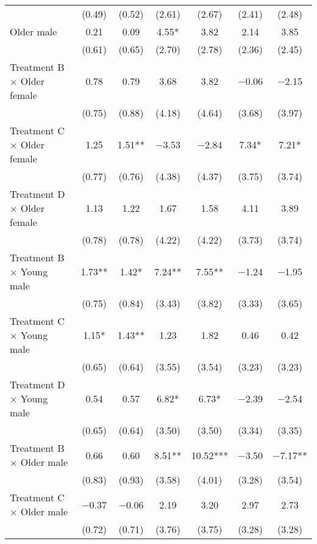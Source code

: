 \documentclass[12pt, a4paper]{article}
\begin{document}
\begin{table}[H]
\begin{threeparttable}
\begin{tabular}[t]{lcccccc}
 & (\num{0.49}) & (\num{0.52}) & (\num{2.61}) & (\num{2.67}) & (\num{2.41}) & (\num{2.48})\\
Older male & \num{0.21} & \num{0.09} & \num{4.55}* & \num{3.82} & \num{2.14} & \num{3.85}\\
 & (\num{0.61}) & (\num{0.65}) & (\num{2.70}) & (\num{2.78}) & (\num{2.36}) & (\num{2.45})\\
Treatment B $\times$ Older female & \num{0.78} & \num{0.79} & \num{3.68} & \num{3.82} & \num{-0.06} & \num{-2.15}\\
 & (\num{0.75}) & (\num{0.88}) & (\num{4.18}) & (\num{4.64}) & (\num{3.68}) & (\num{3.97})\\
Treatment C $\times$ Older female & \num{1.25} & \num{1.51}** & \num{-3.53} & \num{-2.84} & \num{7.34}* & \num{7.21}*\\
 & (\num{0.77}) & (\num{0.76}) & (\num{4.38}) & (\num{4.37}) & (\num{3.75}) & (\num{3.74})\\
Treatment D $\times$ Older female & \num{1.13} & \num{1.22} & \num{1.67} & \num{1.58} & \num{4.11} & \num{3.89}\\
 & (\num{0.78}) & (\num{0.78}) & (\num{4.22}) & (\num{4.22}) & (\num{3.73}) & (\num{3.74})\\
Treatment B $\times$ Young male & \num{1.73}** & \num{1.42}* & \num{7.24}** & \num{7.55}** & \num{-1.24} & \num{-1.95}\\
 & (\num{0.75}) & (\num{0.84}) & (\num{3.43}) & (\num{3.82}) & (\num{3.33}) & (\num{3.65})\\
Treatment C $\times$ Young male & \num{1.15}* & \num{1.43}** & \num{1.23} & \num{1.82} & \num{0.46} & \num{0.42}\\
 & (\num{0.65}) & (\num{0.64}) & (\num{3.55}) & (\num{3.54}) & (\num{3.23}) & (\num{3.23})\\
Treatment D $\times$ Young male & \num{0.54} & \num{0.57} & \num{6.82}* & \num{6.73}* & \num{-2.39} & \num{-2.54}\\
 & (\num{0.65}) & (\num{0.64}) & (\num{3.50}) & (\num{3.50}) & (\num{3.34}) & (\num{3.35})\\
Treatment B $\times$ Older male & \num{0.66} & \num{0.60} & \num{8.51}** & \num{10.52}*** & \num{-3.50} & \num{-7.17}**\\
 & (\num{0.83}) & (\num{0.93}) & (\num{3.58}) & (\num{4.01}) & (\num{3.28}) & (\num{3.54})\\
Treatment C $\times$ Older male & \num{-0.37} & \num{-0.06} & \num{2.19} & \num{3.20} & \num{2.97} & \num{2.73}\\
 & (\num{0.72}) & (\num{0.71}) & (\num{3.76}) & (\num{3.75}) & (\num{3.28}) & (\num{3.28})\\

\end{tabular}
\end{threeparttable}
\end{table}
\end{document}

